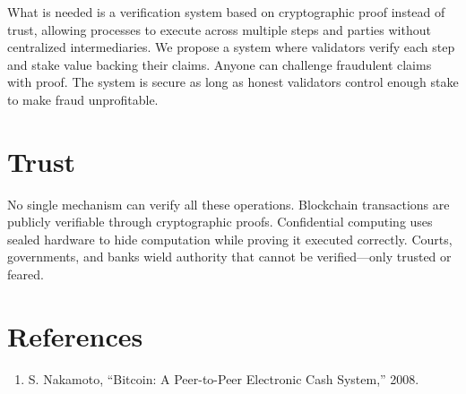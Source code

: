 \documentclass[10pt]{article}
\begin{document}
What is needed is a verification system based on cryptographic proof instead of trust, allowing processes to execute across multiple steps and parties without centralized intermediaries. We propose a system where validators verify each step and stake value backing their claims. Anyone can challenge fraudulent claims with proof. The system is secure as long as honest validators control enough stake to make fraud unprofitable.

\section{Trust}

No single mechanism can verify all these operations. Blockchain transactions are publicly verifiable through cryptographic proofs. Confidential computing uses sealed hardware to hide computation while proving it executed correctly. Courts, governments, and banks wield authority that cannot be verified—only trusted or feared.

\section*{References}

\begin{enumerate}
\item[{[1]}] S. Nakamoto, ``Bitcoin: A Peer-to-Peer Electronic Cash System,'' 2008.
\end{enumerate}
\end{document}
